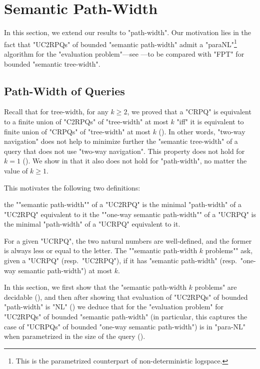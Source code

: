 \section{\AP{}Semantic Path-Width}
\label{sec:semantic-path-width}

In this section, we extend our results to "path-width". Our motivation lies in the fact that "UC2RPQs" of bounded "semantic path-width" admit a "paraNL"\footnote{This is the parametrized counterpart of non-deterministic logspace.} algorithm for the 
"evaluation problem"---see ---to be compared with "FPT" for bounded "semantic tree-width".

\subsection{\AP{}Path-Width of Queries}

Recall that for tree-width, for any $k \geq 2$, we proved that a "CRPQ" is equivalent to a
finite union of "C2RPQs" of "tree-width" at most $k$ "iff" it is equivalent to finite union of
"CRPQs" of "tree-width" at most $k$ (). In other words, "two-way navigation" does not help to minimize further the "semantic tree-width" of a query that does not use "two-way navigation". This property does not hold for $k=1$
(). We show in  that it also does not hold for
"path-width", no matter the value of $k \geq 1$.

This motivates the following two definitions:
\begin{itemize}
	\itemAP the ""semantic path-width"" of a "UC2RPQ" is the minimal "path-width"
	of a "UC2RPQ" equivalent to it
	\itemAP the ""one-way semantic path-width"" of a "UCRPQ" is the minimal "path-width"
		of a "UCRPQ" equivalent to it.
\end{itemize}
For a given "UCRPQ", the two natural numbers are well-defined, and the former is always less or equal to
the letter.
The \AP ""semantic path-width $k$ problems"" ask, given a "UCRPQ" (resp.\ "UC2RPQ"), if it has
"semantic path-width" (resp.\ "one-way semantic path-width") at most $k$.

In this section, we first show that the "semantic path-width $k$ problems"
are decidable (), and then 
after showing that evaluation of "UC2RPQs" of bounded "path-width" is "NL" () we deduce that for the "evaluation problem" for
"UC2RPQs" of bounded "semantic path-width" (in particular, this captures the
case of "UCRPQs" of bounded "one-way semantic path-width") is in
"para-NL" when parametrized in the size of the query ().

